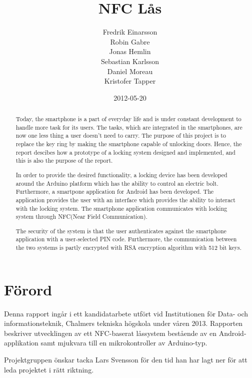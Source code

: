 \documentclass[11pt]{article}
\begin{document}
\title{NFC Lås}

\date{2012-05-20}

\author{Fredrik Einarsson\\
    	Robin Gabre\\
		Jonas Hemlin\\
		Sebastian Karlsson\\
		Daniel Moreau\\ 
		Kristofer Tapper\\}


\section*{Förord}
Denna rapport ingår i ett kandidatarbete utfört vid Institutionen för Data- och informationsteknik, Chalmers tekniska högskola under våren 2013. Rapporten beskriver utvecklingen av ett NFC-baserat låssystem bestående av en Android-applikation samt mjukvara till en mikrokontroller av Arduino-typ.

Projektgruppen önskar tacka Lars Svensson för den tid han har lagt ner för att leda projektet i rätt riktning.

\newpage

\renewcommand{\abstractname}{Abstract}
\begin{abstract}
Today, the smartphone is a part of everyday life and is under constant development to handle more task for its users. The tasks, which are integrated in the smartphones, are now one less thing a user doesn’t need to carry. The purpose of this project is to replace the key ring by making the smartphone capable of unlocking doors. Hence, the report descibes how a prototype of a locking system designed and implemented, and this is also the purpose of the report.

In order to provide the desired functionality, a locking device has been developed around the Arduino platform which has the ability to control an electric bolt. Furthermore, a smartpone application for Android has been developed. The application provides the user with an interface which provides the ability to interact with the locking system. The smartphone application communicates with locking system through NFC(Near Field Communication).

The security of the system is that the user authenticates against the smartphone application with a user-selected PIN code. Furthermore, the communication between the two systems is partly encrypted with RSA encryption algorithm with 512 bit keys.

\end{abstract}
\newpage
\end{document}
